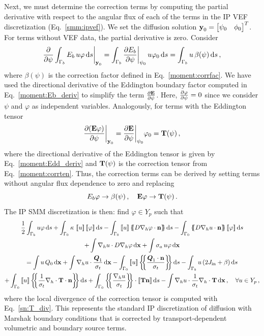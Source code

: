 \documentclass[../doc.tex]{subfiles}
\begin{document}
Next, we must determine the correction terms by computing the partial derivative with respect to the angular flux of each of the terms in the IP VEF discretization (Eq.~\ref{smm:ipvef}). We set the diffusion solution $\boldsymbol{\mathrm{y}}_0 = \begin{bmatrix} \psi_0 & \phi_0 \end{bmatrix}^T$. For terms without VEF data, the partial derivative is zero. Consider 
	\begin{equation}
		\frac{\partial }{\partial \psi}\int_{\Gamma_b} E_b\, u \varphi \mathop{}\!\mathrm{d} s \biggr\rvert_{\boldsymbol{\mathrm{y}}_0} = \int_{\Gamma_b} \frac{\partial E_b}{\partial \psi}\biggr\rvert_{\psi_0} \, u \varphi_0 \mathop{}\!\mathrm{d} s = \int_{\Gamma_b} u\, \beta(\psi) \mathop{}\!\mathrm{d} s \,, 
	\end{equation}
where $\beta(\psi)$ is the correction factor defined in Eq.~\ref{moment:corrfac}. We have used the directional derivative of the Eddington boundary factor computed in Eq.~\ref{moment:Eb_deriv} to simplify the term $\frac{\partial \boldsymbol{\mathrm{E}}}{\partial \psi}$. 
Here, $\frac{\partial \varphi}{\partial \psi} = 0$ since we consider $\psi$ and $\varphi$ as independent variables. 
Analogously, for terms with the Eddington tensor
	\begin{equation}
		\frac{\partial (\boldsymbol{\mathrm{E}}\varphi)}{\partial \psi}\biggr\rvert_{\boldsymbol{\mathrm{y}}_0} = \frac{\partial \boldsymbol{\mathrm{E}}}{\partial \psi}\biggr\rvert_{\psi_0} \varphi_0 = \boldsymbol{\mathrm{T}}(\psi) \,,
	\end{equation}
where the directional derivative of the Eddington tensor is given by Eq.~\ref{moment:Edd_deriv} and $\boldsymbol{\mathrm{T}}(\psi)$ is the correction tensor from Eq.~\ref{moment:corrten}. 
Thus, the correction terms can be derived by setting terms without angular flux dependence to zero and replacing 
	\begin{equation}
		E_b\varphi \rightarrow \beta(\psi) \,, \quad \boldsymbol{\mathrm{E}}\varphi \rightarrow \boldsymbol{\mathrm{T}}(\psi) \,. 
	\end{equation}
The IP SMM discretization is then: find $\varphi \in Y_p$ such that 
	\begin{multline}
		\frac{1}{2}\int_{\Gamma_b} u\varphi \ud s + \int_{\Gamma_0} \kappa\, \jump{u}\jump{\varphi} \ud s - \int_{\Gamma_0} \jump{u}\avg{D\nablah\varphi\cdot\n} \ud s - \int_{\Gamma_0} \avg{D\nablah u\cdot\n} \jump{\varphi} \ud s \\
		+ \int \nablah u \cdot D\nablah\varphi \ud \x + \int \sigma_a\, u \varphi \ud \x \\
		= \int u\, Q_0 \ud \x + \int \nablah u \cdot \frac{\vec{Q}_1}{\sigma_t} \ud \x - \int_{\Gamma_0} \jump{u} \avg{\frac{\vec{Q}_1\cdot\n}{\sigma_t}} \ud s - \int_{\Gamma_b} u\paren{2\Jin + \beta} \ud s \\
		+ \int_{\Gamma_0} \jump{u}\avg{\frac{1}{\sigma_t}\nablah\cdot\T\cdot\n} \ud s + \int_{\Gamma_0} \avg{\frac{\nablah u}{\sigma_t}} \cdot\jump{\T\n} \ud s - \int \nablah u\cdot \frac{1}{\sigma_t}\nablah\cdot\T \ud \x \,, \quad \forall u \in Y_p \,, 
	\end{multline}
where the local divergence of the correction tensor is computed with Eq.~\ref{sn:T_div}. 
This represents the standard IP discretization of diffusion with Marshak boundary conditions that is corrected by transport-dependent volumetric and boundary source terms. 
\end{document}
